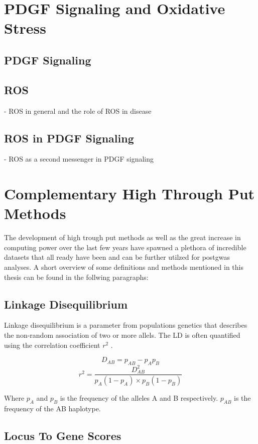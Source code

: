 \section{PDGF Signaling and Oxidative Stress}
\label{sec:haosms}
    \subsection{PDGF Signaling}
    \label{subsec:pdf_signaling}

    \subsection{ROS}
    \label{subsec:ROS}
    - ROS in general and the role of ROS in disease

    \subsection{ROS in PDGF Signaling}
    \label{subsec:ROS_signaling}
    - ROS as a second messenger in PDGF signaling

\section{Complementary High Through Put Methods}
\label{sec:bioinformatics}
The development of high trough put methods as well as the great increase in computing power over the last few years have spawned a plethora of incredible datasets that all ready have been and can be further utilzed for post\ac{gwas} analyses. A short overview of some definitions and methods mentioned in this thesis can be found in the follwing paragraphs:

    \subsection{Linkage Disequilibrium}
    Linkage disequilibrium is a parameter from populations genetics that describes the non-random association of two or more allels. The LD is often quantified using the correlation coefficient $r^2$ \cite{slatkinLinkageDisequilibriumUnderstanding2008}.

    $$ D_{AB} = p_{AB} − p_A p_B $$
    $$ r^2 = \frac{D_{AB}^2}{p_A (1-p_A) \times p_B (1-p_B)} $$

    Where $p_A$ and $p_B$ is the frequency of the alleles A and B respectively. $p_{AB}$ is the frequency of the AB haplotype.

    \subsection{Locus To Gene Scores}
    \cite{mountjoyOpenApproachSystematically2021}

